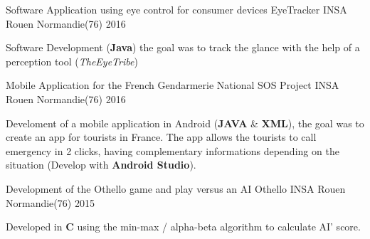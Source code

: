 

\begin{cventries}

  \cventry
	{Software Application using eye control for consumer devices} %
	{EyeTracker} %
	{INSA Rouen Normandie(76)} %
	{2016} %
	{
		\begin{cvitems} %
			\item{Software Development (\textbf{Java}) the goal was to track the glance with the help of a perception tool (\textit{TheEyeTribe}) }
		\end{cvitems}
	}

  \cventry
	{Mobile Application for the French Gendarmerie National} %
	{SOS Project} %
	{INSA Rouen Normandie(76)} %
	{2016} %
	{
		\begin{cvitems} %
			\item{Develoment of a mobile application in Android (\textbf{JAVA} \& \textbf{XML}), the goal was to create an app for tourists in France. The app allows the tourists to call emergency in 2 clicks, having complementary informations depending on the situation (Develop with \textbf{Android Studio}).}
		\end{cvitems}
	}

  \cventry
	{Development of the Othello game and play versus an AI} %
	{Othello} %
	{INSA Rouen Normandie(76)} %
	{2015} %
	{
		\begin{cvitems} %
			\item{Developed in \textbf{C} using the min-max / alpha-beta algorithm to calculate AI' score.}
		\end{cvitems}
	}


\end{cventries}
